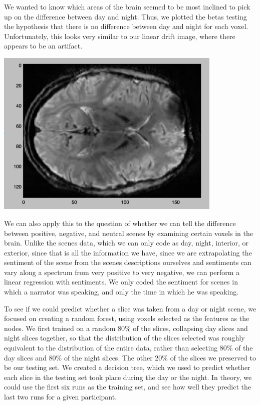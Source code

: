 We wanted to know which areas of the brain seemed to be most inclined to pick
up on the difference between day and night.  Thus, we plotted the betas
testing the hypothesis that there is no difference between day and night for
each voxel.  Unfortunately, this looks very similar to our linear drift image,
where there appears to be an artifact.

\begin{center}
\includegraphics[height=8cm]{7}
\end{center}

We can also apply this to the question of whether we can tell the difference
between positive, negative, and neutral scenes by examining certain voxels in
the brain. Unlike the scenes data, which we can only code as day, night,
interior, or exterior, since that is all the information we have, since we are
extrapolating the sentiment of the scene from the scenes descriptions
ourselves and sentiments can vary along a spectrum from very positive to very
negative, we can perform a linear regression with sentiments.  We only coded
the sentiment for scenes in which a narrator was speaking, and only the time
in which he was speaking.

To see if we could predict whether a slice was taken from a day or night
scene, we focused on creating a random forest, using voxels selected as the
features as the nodes.  We first trained on a random 80\% of the slices,
collapsing day slices and night slices together, so that the distribution of
the slices selected was roughly equivalent to the distribution of the entire
data, rather than selecting 80\% of the day slices and 80\% of the night
slices.  The other 20\% of the slices we preserved to be our testing set.  We
created a decision tree, which we used to predict whether each slice in the
testing set took place during the day or the night.  In theory, we could use
the first six runs as the training set, and see how well they predict the last
two runs for a given participant.


